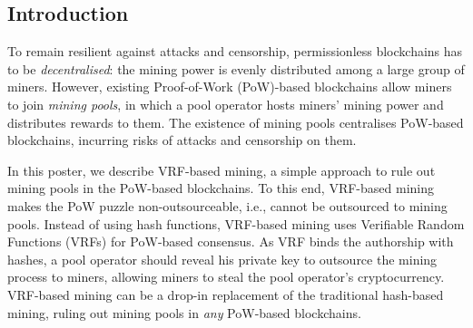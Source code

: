 \documentclass[a0,portrait]{a0poster}
\begin{document}
\vspace{1cm} %


\begin{multicols}{2} %


    \color{Navy} %


    \color{SaddleBrown} %

    \section*{Introduction}

    To remain resilient against attacks and censorship, permissionless blockchains has to be \emph{decentralised}: the mining power is evenly distributed among a large group of miners.
    However, existing Proof-of-Work (PoW)-based blockchains allow miners to join \emph{mining pools}, in which a pool operator hosts miners' mining power and distributes rewards to them.
    The existence of mining pools centralises PoW-based blockchains, incurring risks of attacks and censorship on them.

    In this poster, we describe VRF-based mining, a simple approach to rule out mining pools in the PoW-based blockchains.
    To this end, VRF-based mining makes the PoW puzzle non-outsourceable, i.e., cannot be outsourced to mining pools.
    Instead of using hash functions, VRF-based mining uses Verifiable Random Functions (VRFs) for PoW-based consensus.
    As VRF binds the authorship with hashes, a pool operator should reveal his private key to outsource the mining process to miners, allowing miners to steal the pool operator's cryptocurrency.
    VRF-based mining can be a drop-in replacement of the traditional hash-based mining, ruling out mining pools in \emph{any} PoW-based blockchains.


\end{multicols}
\end{document}
